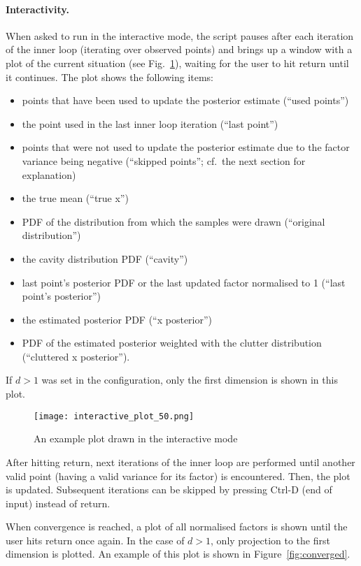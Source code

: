 \documentclass[11pt]{article}
\begin{document}
\paragraph{Interactivity.} When asked to run in the interactive mode, the 
script pauses after each iteration of the inner loop (iterating over 
observed points) and brings up a window with a plot of the current 
situation (see Fig.~\ref{fig:interactive_plot}), waiting for the user to 
hit return until it continues. The plot shows the following items:
\begin{itemize}
	\item points that have been used to update the posterior estimate 
		(``used points'')
	\item the point used in the last inner loop iteration (``last 
		point'')
	\item points that were not used to update the posterior estimate due 
		to the factor variance being negative (``skipped points''; cf.\ the 
		next section for explanation)
	\item the true mean (``true x'')
	\item PDF of the distribution from which the samples were drawn 
		(``original distribution'')
	\item the cavity distribution PDF (``cavity'')
	\item last point's posterior PDF or the last updated factor 
		normalised to 1 (``last point's posterior'')
	\item the estimated posterior PDF (``x posterior'')
	\item PDF of the estimated posterior weighted with the clutter 
		distribution (``cluttered x posterior'').
\end{itemize}
If $d > 1$ was set in the configuration, only the first dimension is shown 
in this plot.

\begin{figure}
	\centering
	\texttt{[image: interactive\_plot\_50.png]}
	\caption{An example plot drawn in the interactive mode}
	\label{fig:interactive_plot}
\end{figure}

After hitting return, next iterations of the inner loop are performed until 
another valid point (having a valid variance for its factor) is 
encountered. Then, the plot is updated. Subsequent iterations can be 
skipped by pressing Ctrl-D (end of input) instead of return.

When convergence is reached, a plot of all normalised factors is shown 
until the user hits return once again. In the case of $d > 1$, only 
projection to the first dimension is plotted. An example of this plot is 
shown in Figure~\ref{fig:converged}.
\end{document}
